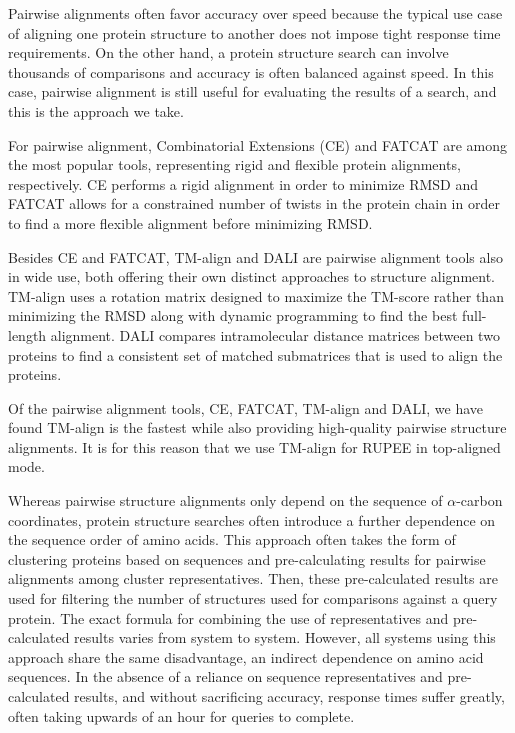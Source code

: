 \documentclass[10pt,letterpaper]{article}
\newcommand{\ca}{$\alpha$-carbon\xspace}
\begin{document}
Pairwise alignments often favor accuracy over speed because the typical use case of aligning one protein structure to another does not impose tight response time requirements. 
On the other hand, a protein structure search can involve thousands of comparisons and accuracy is often balanced against speed. 
In this case, pairwise alignment is still useful for evaluating the results of a search, and this is the approach we take. 

For pairwise alignment, Combinatorial Extensions (CE) \cite{Shindyalov1998} and FATCAT \cite{Ye2003} are among the most popular tools, representing rigid and flexible protein alignments, respectively. 
CE performs a rigid alignment in order to minimize RMSD and FATCAT allows for a constrained number of twists in the protein chain in order to find a more flexible alignment before minimizing RMSD.

Besides CE and FATCAT, TM-align \cite{Zhang2005} and DALI \cite{Sander1995} are pairwise alignment tools also in wide use, both offering their own distinct approaches to structure alignment. 
TM-align uses a rotation matrix designed to maximize the TM-score rather than minimizing the RMSD along with dynamic programming to find the best full-length alignment. 
DALI compares intramolecular distance matrices between two proteins to find a consistent set of matched submatrices that is used to align the proteins. 

Of the pairwise alignment tools, CE, FATCAT, TM-align and DALI, we have found TM-align is the fastest while also providing high-quality pairwise structure alignments. 
It is for this reason that we use TM-align for RUPEE in top-aligned mode. 

Whereas pairwise structure alignments only depend on the sequence of \ca coordinates, protein structure searches often introduce a further dependence on the sequence order of amino acids.
This approach often takes the form of clustering proteins based on sequences and pre-calculating results for pairwise alignments among cluster representatives. 
Then, these pre-calculated results are used for filtering the number of structures used for comparisons against a query protein.
The exact formula for combining the use of representatives and pre-calculated results varies from system to system.
However, all systems using this approach share the same disadvantage, an indirect dependence on amino acid sequences. 
In the absence of a reliance on sequence representatives and pre-calculated results, and without sacrificing accuracy, response times suffer greatly, often taking upwards of an hour for queries to complete. 
\end{document}
